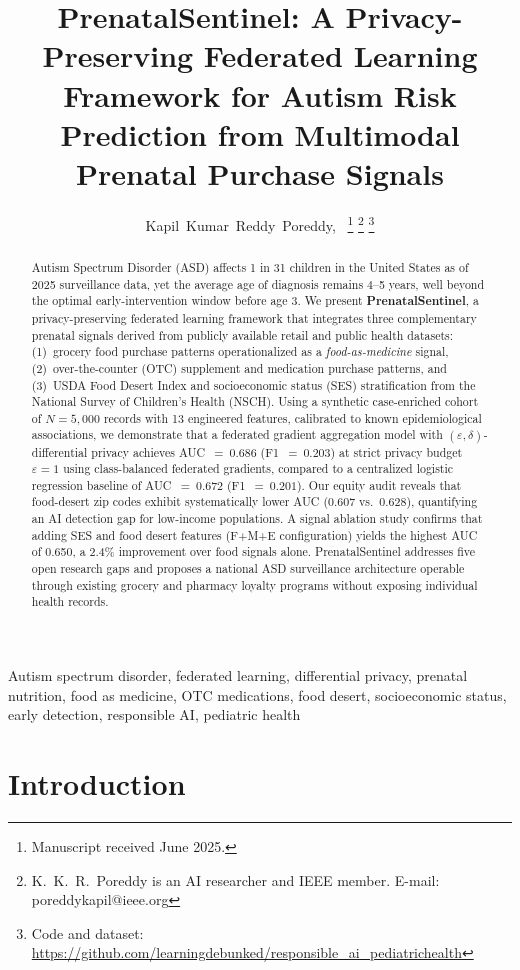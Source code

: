 \documentclass[journal]{IEEEtran}
\title{PrenatalSentinel: A Privacy-Preserving Federated Learning
       Framework for Autism Risk Prediction from Multimodal
       Prenatal Purchase Signals}
\author{Kapil~Kumar~Reddy~Poreddy,~\IEEEmembership{Member,~IEEE}
\thanks{Manuscript received June 2025.}
\thanks{K.~K.~R.~Poreddy is an AI researcher and IEEE member.
        E-mail: poreddykapil@ieee.org}
\thanks{Code and dataset: \url{https://github.com/learningdebunked/responsible_ai_pediatrichealth}}
}
\newcommand{\eps}{\varepsilon}
\begin{document}
\maketitle

\begin{abstract}
Autism Spectrum Disorder (ASD) affects 1 in 31 children in the United
States as of 2025 surveillance data, yet the average age of diagnosis
remains 4--5 years, well beyond the optimal early-intervention window
before age 3. We present \textbf{PrenatalSentinel}, a privacy-preserving
federated learning framework that integrates three complementary prenatal
signals derived from publicly available retail and public health
datasets: (1)~grocery food purchase patterns operationalized as a
\textit{food-as-medicine} signal, (2)~over-the-counter (OTC) supplement
and medication purchase patterns, and (3)~USDA Food Desert Index and
socioeconomic status (SES) stratification from the National Survey of
Children's Health (NSCH). Using a synthetic case-enriched cohort of
$N=5{,}000$ records with 13 engineered features, calibrated to known
epidemiological associations, we demonstrate that a federated gradient
aggregation model with $(\eps,\delta)$-differential privacy achieves
AUC~$=~0.686$ (F1~$=~0.203$) at strict privacy budget $\eps=1$ using
class-balanced federated gradients, compared to a centralized logistic
regression baseline of AUC~$=~0.672$ (F1~$=~0.201$). Our equity
audit reveals that food-desert zip codes exhibit systematically lower
AUC (0.607 vs.~0.628), quantifying an AI detection gap for low-income
populations. A signal ablation study confirms that adding SES and food
desert features (F+M+E configuration) yields the highest AUC of 0.650,
a 2.4\% improvement over food signals alone. PrenatalSentinel addresses
five open research gaps and proposes a national ASD surveillance
architecture operable through existing grocery and pharmacy loyalty
programs without exposing individual health records.
\end{abstract}

\begin{IEEEkeywords}
Autism spectrum disorder, federated learning, differential privacy,
prenatal nutrition, food as medicine, OTC medications, food desert,
socioeconomic status, early detection, responsible AI, pediatric health
\end{IEEEkeywords}

\section{Introduction}
\label{sec:intro}
\end{document}
